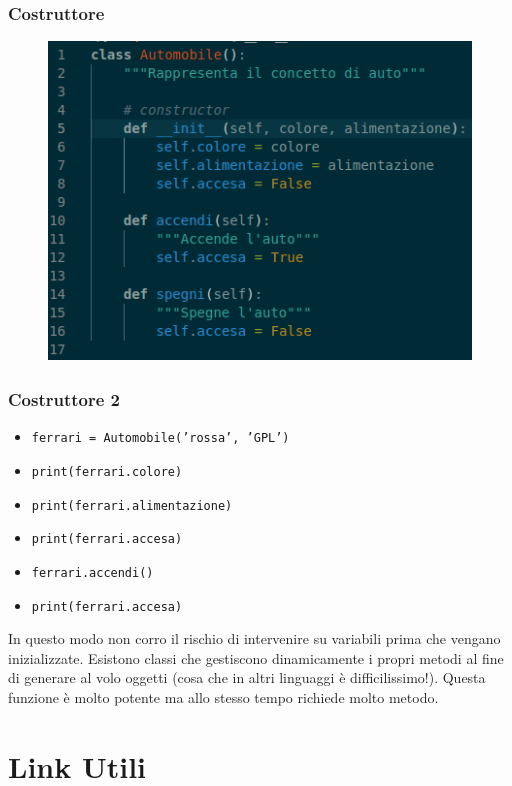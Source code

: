 \documentclass{beamer}
\begin{document}
\begin{frame}
    \frametitle{Costruttore}
    \begin{figure}
        \centering
        \includegraphics[width=0.75\linewidth]{constructor.png}
    \end{figure}
\end{frame}

\begin{frame}

    \frametitle{Costruttore 2}
        \begin{itemize}
        \item \texttt{ferrari = Automobile('rossa', 'GPL')}
        \item \texttt{print(ferrari.colore)}
        \item \texttt{print(ferrari.alimentazione)}
        \item \texttt{print(ferrari.accesa)}
        \item \texttt{ferrari.accendi()}
        \item \texttt{print(ferrari.accesa)}
    \end{itemize}

    In questo modo non corro il rischio di intervenire su variabili prima che vengano inizializzate.
    Esistono classi che gestiscono dinamicamente i propri metodi al fine di generare al volo oggetti (cosa che in altri linguaggi è difficilissimo!). Questa funzione è molto potente ma allo stesso tempo richiede molto metodo.

\end{frame}

\section{Link Utili}
\end{document}
